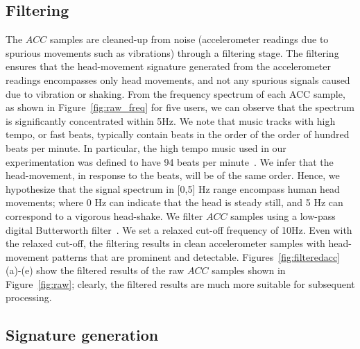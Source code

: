 \subsection{Filtering}

The $ACC$ samples are cleaned-up from noise (accelerometer
readings due to spurious movements such as vibrations) through
a filtering stage.
The filtering ensures that the head-movement signature
generated from the accelerometer readings encompasses
only head movements, and not any spurious signals caused due to
vibration or shaking. From the frequency
spectrum of each ACC sample, as shown in Figure~\ref{fig:raw_freq} for five users,
we can observe that the spectrum is significantly
concentrated within 5Hz.
We note that music tracks with high tempo, or fast beats, typically contain
beats in the order of the order of hundred beats per minute.
In particular, the high tempo music used in our experimentation was defined to
have 94 beats per minute~\cite{beats}.
We infer that the head-movement, in response
to the beats, will be of the same order. Hence, we hypothesize that
the signal spectrum in [0,5] Hz range encompass
human head movements; where 0 Hz can indicate that the head is
steady still, and 5 Hz can correspond to a vigorous head-shake.
We filter $ACC$ samples using a low-pass digital Butterworth
filter~\cite{challis1983design}. We set a relaxed cut-off frequency of 10Hz.
Even with the relaxed cut-off, the filtering results in
clean accelerometer samples with head-movement patterns
that are prominent and detectable. Figures~\ref{fig:filteredacc} (a)-(e) show the filtered results of the raw $ACC$ samples shown in Figure~\ref{fig:raw}; clearly, the filtered results are much more suitable for subsequent processing.


\subsection{Signature generation}

